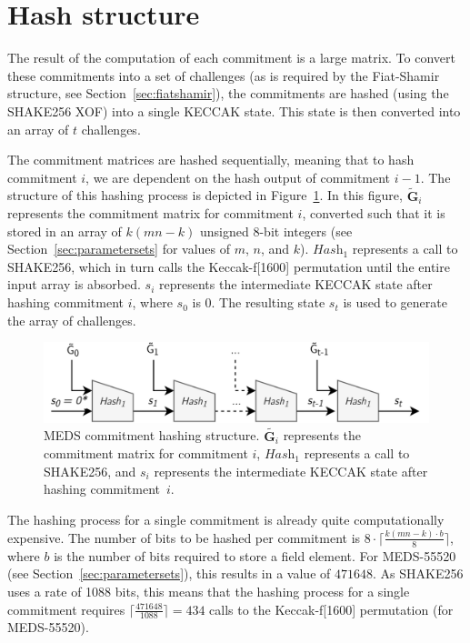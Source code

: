 \documentclass[11pt,a4paper]{report}
\theoremstyle{definition}
\begin{document}
\section{Hash structure}
\label{sec:hashfunctionoptimization}
The result of the computation of each commitment is a large matrix. To convert these commitments into a set of challenges (as is required by the Fiat-Shamir structure, see Section~\ref{sec:fiatshamir}), the commitments are hashed (using the SHAKE256 XOF) into a single KECCAK state. This state is then converted into an array of $t$ challenges.

The commitment matrices are hashed sequentially, meaning that to hash commitment $i$, we are dependent on the hash output of commitment $i - 1$. The structure of this hashing process is depicted in Figure~\ref{fig:hashstructure}. In this figure, $\tilde{\textbf{G}}_i$ represents the commitment matrix for commitment $i$, converted such that it is stored in an array of $k(mn - k)$ unsigned 8-bit integers (see Section~\ref{sec:parametersets} for values of $m$, $n$, and $k$). $\textit{Hash}_1$ represents a call to SHAKE256, which in turn calls the Keccak-f[1600] permutation until the entire input array is absorbed. $s_i$ represents the intermediate KECCAK state after hashing commitment $i$, where $s_0$ is 0. The resulting state $s_t$ is used to generate the array of challenges.

\begin{figure}
  \centering
  \includegraphics[width=\textwidth]{hash/hash_struct_seq.png}
  \caption{MEDS commitment hashing structure. $\tilde{\textbf{G}_i}$ represents the commitment matrix for commitment $i$, $\textit{Hash}_1$ represents a call to SHAKE256, and $s_i$ represents the intermediate KECCAK state after hashing commitment~$i$.}
  \label{fig:hashstructure}
\end{figure}

The hashing process for a single commitment is already quite computationally expensive. The number of bits to be hashed per commitment is $8 \cdot \lceil \frac{k(mn-k) \cdot b}{8} \rceil$, where $b$ is the number of bits required to store a field element. For MEDS-55520 (see Section~\ref{sec:parametersets}), this results in a value of $471648$. As SHAKE256 uses a rate of 1088 bits, this means that the hashing process for a single commitment requires $\lceil \frac{471648}{1088} \rceil = 434$ calls to the Keccak-f[1600] permutation (for MEDS-55520).
\end{document}
